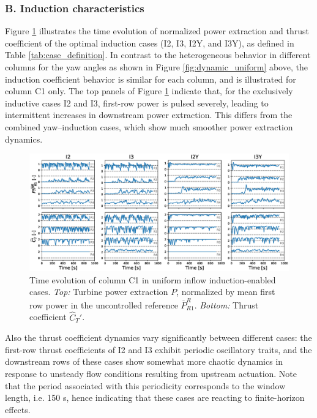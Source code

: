 	
	\subsubsection{B. Induction characteristics}
	Figure \ref{fig:dynamic_ctfilt} illustrates the time evolution of normalized power extraction and thrust coefficient of the optimal induction cases (I2, I3, I2Y, and I3Y), as defined in Table \ref{tab:case_definition}. In contrast to the heterogeneous behavior in different columns for the yaw angles as shown in Figure \ref{fig:dynamic_uniform} above, the induction coefficient behavior is similar for each column, and is illustrated for column C1 only. The top panels of Figure \ref{fig:dynamic_ctfilt} indicate that, for the exclusively inductive cases I2 and I3, first-row power is pulsed severely, leading to intermittent increases in downstream power extraction. This differs from the combined yaw--induction cases, which show much smoother power extraction dynamics. 
	\begin{figure}
		\includegraphics[width=\textwidth]{chapters/optimal_yaw_control/power_ctfilt_lam.eps}	
		\caption{Time evolution of column C1 in uniform inflow induction-enabled cases. \emph{Top: } Turbine power extraction $P$, normalized by mean first row power in the uncontrolled reference $\overline{P}_{R1}^R$. \emph{Bottom: } Thrust coefficient $\widehat{C}_T'$. \label{fig:dynamic_ctfilt}}
	\end{figure}
	
	Also the thrust coefficient dynamics vary significantly between different cases: the first-row thrust coefficients of I2 and I3 exhibit periodic oscillatory traits, and the downstream rows of these cases show somewhat more chaotic dynamics in response to unsteady flow conditions resulting from upstream actuation. Note that the period associated with this periodicity corresponds to the window length, i.e. 150 s, hence indicating that these cases are reacting to finite-horizon effects. 
	
